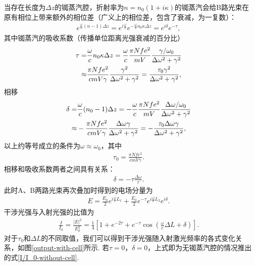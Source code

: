 \documentclass[a4paper, 10pt]{article}
\providecommand{\abs}[1]{\left\lvert#1\right\rvert} %
\begin{document}
\begin{multicols}{2}
当存在长度为$\Delta z$的铷蒸汽腔，折射率为$n=n_0(1+i\kappa)$的铷蒸汽会给B路光束在原有相位上带来额外的相位差（广义上的相位差，包含了衰减，为一复数）：
\begin{align}
    e^{\frac{\omega}{c}(n-1)\Delta z}=e^{i\frac{\omega}{c}}e^{-\frac{\omega}{c}n_0\kappa\Delta z}=e^{i\delta}e^{-\tau},
\end{align}
其中铷蒸汽的吸收系数（传播单位距离光强衰减的百分比）
\begin{align}
    \notag\tau=&\frac{\omega}{c}n_0\kappa\Delta z=\frac{\omega}{c}\frac{\pi Nfe^2}{mV}\frac{\gamma/\omega_0}{\Delta\omega^2+\gamma^2}\\
    \approx&\frac{\pi Nfe^2}{cmV\gamma}\frac{\gamma^2}{\Delta\omega^2+\gamma^2}=\frac{\tau_0\gamma^2}{\Delta\omega^2+\gamma^2},
\end{align}
相移
\begin{align}
    \notag\delta=&\frac{\omega}{c}(n_0-1)\Delta z=-\frac{\omega}{c}\frac{\pi Nfe^2}{mV}\frac{\Delta\omega/\omega_0}{\Delta\omega^2+\gamma^2}\\
    \approx&-\frac{\pi Nfe^2}{cmV\gamma}\frac{\Delta\omega\gamma}{\Delta\omega^2+\gamma^2}=-\frac{\tau_0\Delta\omega\gamma}{\Delta\omega^2+\gamma^2},
\end{align}
以上约等号成立的条件为$\omega\approx\omega_0$，其中
\begin{align}
    \tau_0=\frac{\pi Nfe^2}{cmV\gamma}.
\end{align}
相移和吸收系数两者之间具有关系：
\begin{align}
    \delta=-\tau\frac{\Delta\omega}{\tau}.
\end{align}
此时A、B两路光束再次叠加时得到的电场分量为
\begin{align}
    E=\frac{E_0}{2}e^{i\frac{\omega}{c}L_1}+\frac{E_0}{2}e^{-\tau}e^{i\frac{\omega}{c}L_2}e^{i\delta}.
\end{align}
干涉光强与入射光强的比值为
\begin{align}
    \frac{I}{I_0}=\frac{\abs{E}^2}{E_0^2}=\frac{1}{4}\left[1+e^{-2\tau}+e^{-\tau}\cos\left(\frac{\omega}{c}\Delta L+\delta\right)\right].
\end{align}
对于$\tau_0$和$\Delta L$的不同取值，我们可以得到干涉光强随入射激光频率的各式变化关系，如图\ref{output-with-cell}所示. 若$\tau=0$，$\delta=0$，上式即为无铷蒸汽腔的情况推出的式\eqref{I/I_0-without-cell}.
\begin{figure}[H]
    \centering
    \subfigure[$\tau_0=0.4$]{
}
\end{figure}
\end{multicols}
\end{document}
